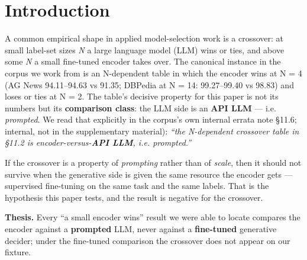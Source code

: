 \documentclass[10pt]{article}
\begin{document}
\begin{abstract}
\textbf{Not in this paper.} We make \textbf{no latency claim}: the encoder heads were timed locally in one forward batch while the 4B figures come from a served stack's stored rows, so the tree cannot support a fair latency comparison (see \S6.1). We also do \textbf{not} report $\kappa$ = 0.9014 (first blind reader) or $\kappa$ = 0.8577 (second, independent blind reader) --- nor their mutual $\kappa$ = 0.9125 --- as inter-annotator agreement: both labellers were \textbf{models}, so this is machine reproducibility of the fixture, not human agreement. The second reader \textbf{partially} replicates the first: the $\kappa$ magnitude holds (both $\ge$ 0.85) but the exact 0.90 headline does not. An independent human labeller is still owed (\S6.2).

\end{abstract}
\section{Introduction}

A common empirical shape in applied model-selection work is a crossover: at small label-set sizes \emph{N} a large language model (LLM) wins or ties, and above some \emph{N} a small fine-tuned encoder takes over. The canonical instance in the corpus we work from is an N-dependent table in which the encoder wins at N = 4 (AG News 94.11--94.63 vs 91.35; DBPedia at N = 14: 99.27--99.40 vs 98.83) and loses or ties at N = 2. The table's decisive property for this paper is not its numbers but its \textbf{comparison class}: the LLM side is an \textbf{API LLM} --- i.e. \emph{prompted}. We read that explicitly in the corpus's own internal errata note \S11.6\cite{source_corpus_errata_2026}; internal, not in the supplementary material): \emph{``the N-dependent crossover table in \S11.2 is encoder-versus-\textbf{API LLM}, i.e. prompted.''}

If the crossover is a property of \emph{prompting} rather than of \emph{scale}, then it should not survive when the generative side is given the same resource the encoder gets --- supervised fine-tuning on the same task and the same labels. That is the hypothesis this paper tests, and the result is negative for the crossover.

\textbf{Thesis.} Every ``a small encoder wins'' result we were able to locate compares the encoder against a \textbf{prompted} LLM, never against a \textbf{fine-tuned} generative decider; under the fine-tuned comparison the crossover does not appear on our fixture.
\end{document}
